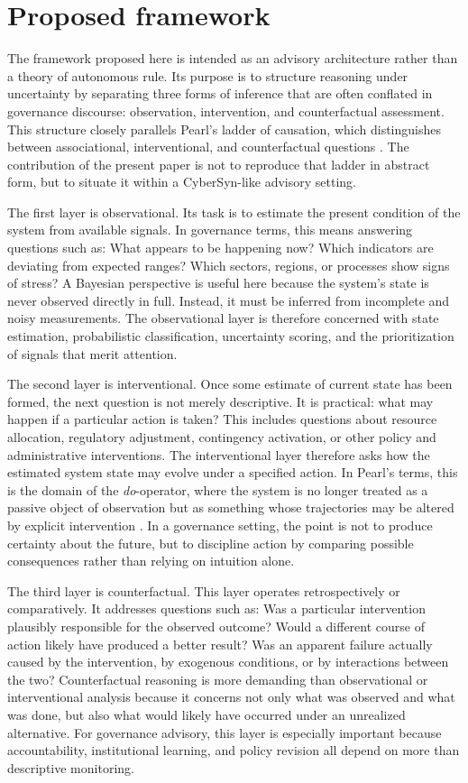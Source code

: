 \documentclass[11pt]{article}
\begin{document}
\section{Proposed framework}

The framework proposed here is intended as an advisory architecture rather than a theory of autonomous rule. Its purpose is to structure reasoning under uncertainty by separating three forms of inference that are often conflated in governance discourse: observation, intervention, and counterfactual assessment. This structure closely parallels Pearl's ladder of causation, which distinguishes between associational, interventional, and counterfactual questions \citep{pearl2000}. The contribution of the present paper is not to reproduce that ladder in abstract form, but to situate it within a CyberSyn-like advisory setting.

The first layer is observational. Its task is to estimate the present condition of the system from available signals. In governance terms, this means answering questions such as: What appears to be happening now? Which indicators are deviating from expected ranges? Which sectors, regions, or processes show signs of stress? A Bayesian perspective is useful here because the system's state is never observed directly in full. Instead, it must be inferred from incomplete and noisy measurements. The observational layer is therefore concerned with state estimation, probabilistic classification, uncertainty scoring, and the prioritization of signals that merit attention.

The second layer is interventional. Once some estimate of current state has been formed, the next question is not merely descriptive. It is practical: what may happen if a particular action is taken? This includes questions about resource allocation, regulatory adjustment, contingency activation, or other policy and administrative interventions. The interventional layer therefore asks how the estimated system state may evolve under a specified action. In Pearl's terms, this is the domain of the \emph{do}-operator, where the system is no longer treated as a passive object of observation but as something whose trajectories may be altered by explicit intervention \citep{pearl2000}. In a governance setting, the point is not to produce certainty about the future, but to discipline action by comparing possible consequences rather than relying on intuition alone.

The third layer is counterfactual. This layer operates retrospectively or comparatively. It addresses questions such as: Was a particular intervention plausibly responsible for the observed outcome? Would a different course of action likely have produced a better result? Was an apparent failure actually caused by the intervention, by exogenous conditions, or by interactions between the two? Counterfactual reasoning is more demanding than observational or interventional analysis because it concerns not only what was observed and what was done, but also what would likely have occurred under an unrealized alternative. For governance advisory, this layer is especially important because accountability, institutional learning, and policy revision all depend on more than descriptive monitoring.
\end{document}

